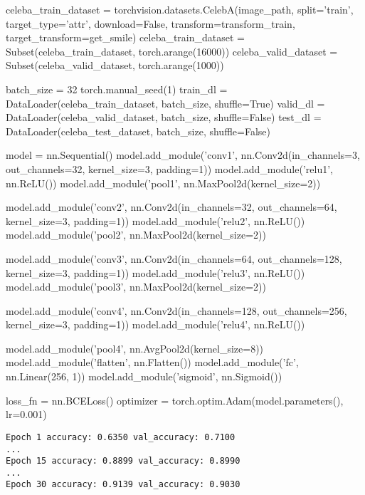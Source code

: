 \begin{pythoncode}
celeba_train_dataset = torchvision.datasets.CelebA(image_path, split='train', target_type='attr', download=False, transform=transform_train, target_transform=get_smile)
celeba_train_dataset = Subset(celeba_train_dataset, torch.arange(16000))
celeba_valid_dataset = Subset(celeba_valid_dataset, torch.arange(1000))
\end{pythoncode}

\begin{pythoncode}
batch_size = 32
torch.manual_seed(1)
train_dl = DataLoader(celeba_train_dataset, batch_size, shuffle=True)
valid_dl = DataLoader(celeba_valid_dataset, batch_size, shuffle=False)
test_dl = DataLoader(celeba_test_dataset, batch_size, shuffle=False)
\end{pythoncode}

\begin{pythoncode}
model = nn.Sequential()
model.add_module('conv1', nn.Conv2d(in_channels=3, out_channels=32, kernel_size=3, padding=1))
model.add_module('relu1', nn.ReLU())
model.add_module('pool1', nn.MaxPool2d(kernel_size=2))

model.add_module('conv2', nn.Conv2d(in_channels=32, out_channels=64, kernel_size=3, padding=1))
model.add_module('relu2', nn.ReLU())
model.add_module('pool2', nn.MaxPool2d(kernel_size=2))

model.add_module('conv3', nn.Conv2d(in_channels=64, out_channels=128, kernel_size=3, padding=1))
model.add_module('relu3', nn.ReLU())
model.add_module('pool3', nn.MaxPool2d(kernel_size=2))

model.add_module('conv4', nn.Conv2d(in_channels=128, out_channels=256, kernel_size=3, padding=1))
model.add_module('relu4', nn.ReLU())

model.add_module('pool4', nn.AvgPool2d(kernel_size=8))
model.add_module('flatten', nn.Flatten())
model.add_module('fc', nn.Linear(256, 1))
model.add_module('sigmoid', nn.Sigmoid())
\end{pythoncode}

\begin{pythoncode}
loss_fn = nn.BCELoss()
optimizer = torch.optim.Adam(model.parameters(), lr=0.001)
\end{pythoncode}

\begin{verbatim}
Epoch 1 accuracy: 0.6350 val_accuracy: 0.7100
...
Epoch 15 accuracy: 0.8899 val_accuracy: 0.8990
...
Epoch 30 accuracy: 0.9139 val_accuracy: 0.9030
\end{verbatim}

